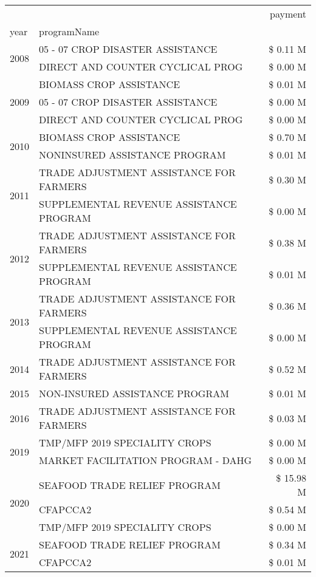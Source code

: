 \begin{tabular}{llr}
\toprule
 &  & payment \\
year & programName &  \\
\midrule
\multirow[t]{2}{*}{2008} & 05 - 07 CROP DISASTER ASSISTANCE & \$ 0.11 M \\
 & DIRECT AND COUNTER CYCLICAL PROG & \$ 0.00 M \\
\cline{1-3}
\multirow[t]{3}{*}{2009} & BIOMASS CROP ASSISTANCE & \$ 0.01 M \\
 & 05 - 07 CROP DISASTER ASSISTANCE & \$ 0.00 M \\
 & DIRECT AND COUNTER CYCLICAL PROG & \$ 0.00 M \\
\cline{1-3}
\multirow[t]{2}{*}{2010} & BIOMASS CROP ASSISTANCE & \$ 0.70 M \\
 & NONINSURED ASSISTANCE PROGRAM & \$ 0.01 M \\
\cline{1-3}
\multirow[t]{2}{*}{2011} & TRADE ADJUSTMENT ASSISTANCE FOR FARMERS & \$ 0.30 M \\
 & SUPPLEMENTAL REVENUE ASSISTANCE PROGRAM & \$ 0.00 M \\
\cline{1-3}
\multirow[t]{2}{*}{2012} & TRADE ADJUSTMENT ASSISTANCE FOR FARMERS & \$ 0.38 M \\
 & SUPPLEMENTAL REVENUE ASSISTANCE PROGRAM & \$ 0.01 M \\
\cline{1-3}
\multirow[t]{2}{*}{2013} & TRADE ADJUSTMENT ASSISTANCE FOR FARMERS & \$ 0.36 M \\
 & SUPPLEMENTAL REVENUE ASSISTANCE PROGRAM & \$ 0.00 M \\
\cline{1-3}
2014 & TRADE ADJUSTMENT ASSISTANCE FOR FARMERS & \$ 0.52 M \\
\cline{1-3}
2015 & NON-INSURED ASSISTANCE PROGRAM & \$ 0.01 M \\
\cline{1-3}
2016 & TRADE ADJUSTMENT ASSISTANCE FOR FARMERS & \$ 0.03 M \\
\cline{1-3}
\multirow[t]{2}{*}{2019} & TMP/MFP 2019 SPECIALITY CROPS & \$ 0.00 M \\
 & MARKET FACILITATION PROGRAM - DAHG & \$ 0.00 M \\
\cline{1-3}
\multirow[t]{3}{*}{2020} & SEAFOOD TRADE RELIEF PROGRAM & \$ 15.98 M \\
 & CFAPCCA2 & \$ 0.54 M \\
 & TMP/MFP 2019 SPECIALITY CROPS & \$ 0.00 M \\
\cline{1-3}
\multirow[t]{2}{*}{2021} & SEAFOOD TRADE RELIEF PROGRAM & \$ 0.34 M \\
 & CFAPCCA2 & \$ 0.01 M \\
\cline{1-3}
\bottomrule
\end{tabular}
